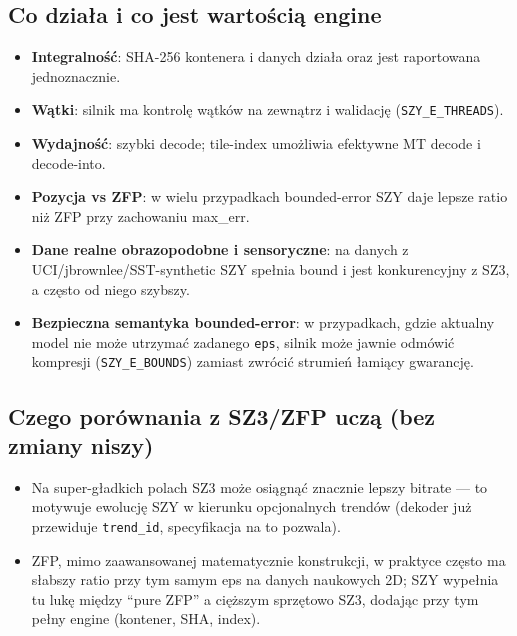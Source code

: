 \documentclass[11pt,a4paper]{article}
\begin{document}
\subsection{Co działa i co jest wartością engine}
\begin{itemize}
  \item \textbf{Integralność}: SHA-256 kontenera i danych działa oraz jest raportowana jednoznacznie.
  \item \textbf{Wątki}: silnik ma kontrolę wątków na zewnątrz i walidację (\texttt{SZY\_E\_THREADS}).
  \item \textbf{Wydajność}: szybki decode; tile-index umożliwia efektywne MT decode i decode-into.
  \item \textbf{Pozycja vs ZFP}: w wielu przypadkach bounded-error SZY daje lepsze ratio niż ZFP przy zachowaniu max\_err.
  \item \textbf{Dane realne obrazopodobne i sensoryczne}: na danych z UCI/jbrownlee/SST-synthetic SZY spełnia bound i jest konkurencyjny z SZ3, a często od niego szybszy.
  \item \textbf{Bezpieczna semantyka bounded-error}: w przypadkach, gdzie aktualny model nie może utrzymać zadanego \texttt{eps}, silnik może jawnie odmówić kompresji (\texttt{SZY\_E\_BOUNDS}) zamiast zwrócić strumień łamiący gwarancję.
\end{itemize}

\subsection{Czego porównania z SZ3/ZFP uczą (bez zmiany niszy)}
\begin{itemize}
  \item Na super-gładkich polach SZ3 może osiągnąć znacznie lepszy bitrate --- to motywuje ewolucję SZY w kierunku opcjonalnych trendów (dekoder już przewiduje \texttt{trend\_id}, specyfikacja na to pozwala).
  \item ZFP, mimo zaawansowanej matematycznie konstrukcji, w praktyce często ma słabszy ratio przy tym samym eps na danych naukowych 2D; SZY wypełnia tu lukę między ``pure ZFP'' a cięższym sprzętowo SZ3, dodając przy tym pełny engine (kontener, SHA, index).
\end{itemize}
\end{document}
